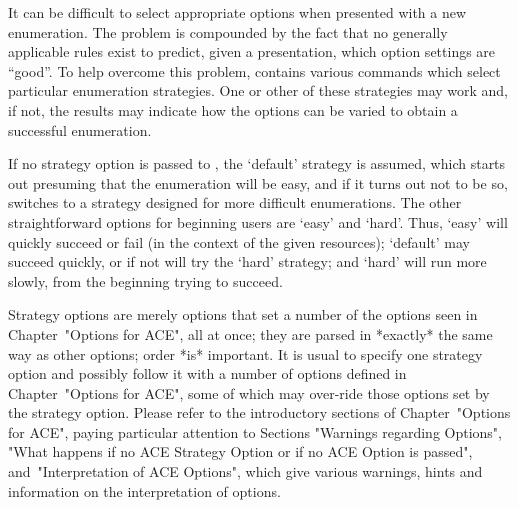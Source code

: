 

It can be difficult to select appropriate options when presented  with
a new enumeration. The problem is  compounded  by  the  fact  that  no
generally applicable rules exist to  predict,  given  a  presentation,
which option settings are ``good''. To  help  overcome  this  problem,
{\ACE} contains various commands which select  particular  enumeration
strategies. One or other of these strategies may work and, if not, the
results may indicate how  the  options  can  be  varied  to  obtain  a
successful enumeration.

If no strategy option is passed to {\ACE}, the `default'  strategy  is
assumed, which starts out presuming that the enumeration will be easy,
and if it turns out not to  be  so,  {\ACE}  switches  to  a  strategy
designed for more difficult enumerations.  The  other  straightforward
options for beginning users are `easy' and `hard'. Thus,  `easy'  will
quickly succeed or fail (in  the  context  of  the  given  resources);
`default' may succeed quickly, or if not will try the `hard' strategy;
and `hard' will run more slowly, from the beginning trying to succeed.

Strategy options are merely options that set a number of  the  options
seen in Chapter~"Options for ACE", all at once;  they  are  parsed  in
*exactly* the same way as other options; order *is* important.  It  is
usual to specify one strategy option and possibly  follow  it  with  a
number of options defined in Chapter~"Options for ACE", some of  which
may over-ride those options set by the strategy option.  Please  refer
to the introductory sections  of  Chapter~"Options  for  ACE",  paying
particular attention to Sections "Warnings regarding  Options",  "What
happens if no ACE Strategy Option or if  no  ACE  Option  is  passed",
and~"Interpretation of ACE  Options",  which  give  various  warnings,
hints and information on the interpretation of options.

